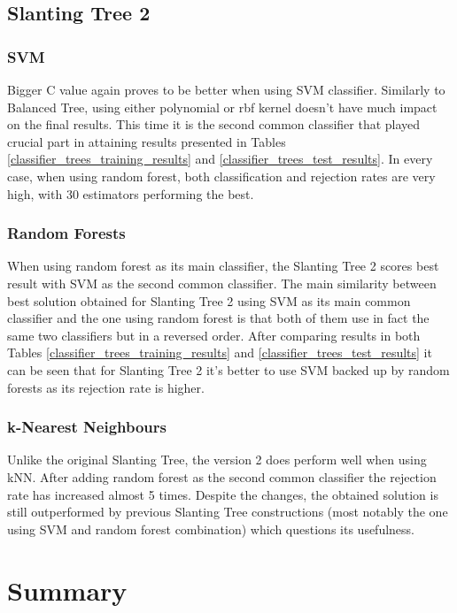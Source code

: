 \subsection{Slanting Tree 2}

\subsubsection{SVM}

Bigger C value again proves to be better when using SVM classifier. Similarly to Balanced Tree, using either polynomial or rbf kernel doesn't have much impact on the final results. This time it is the second common classifier that played crucial part in attaining results presented in Tables \ref{classifier_trees_training_results} and \ref{classifier_trees_test_results}. In every case, when using random forest, both classification and rejection rates are very high, with 30 estimators performing the best.

\subsubsection{Random Forests}

When using random forest as its main classifier, the Slanting Tree 2 scores best result with SVM as the second common classifier. The main similarity between best solution obtained for Slanting Tree 2 using SVM as its main common classifier and the one using random forest is that both of them use in fact the same two classifiers but in a reversed order. After comparing results in both Tables \ref{classifier_trees_training_results} and \ref{classifier_trees_test_results} it can be seen that for Slanting Tree 2 it's better to use SVM backed up by random forests as its rejection rate is higher.

\subsubsection{k-Nearest Neighbours}

Unlike the original Slanting Tree, the version 2 does perform well when using kNN. After adding random forest as the second common classifier the rejection rate has increased almost 5 times. Despite the changes, the obtained solution is still outperformed by previous Slanting Tree constructions (most notably the one using SVM and random forest combination) which questions its usefulness. 

\section{Summary}

